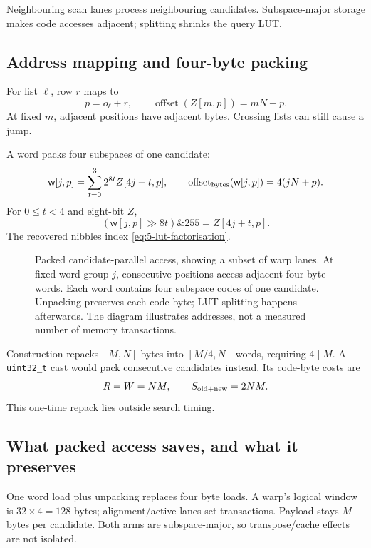 Neighbouring scan lanes process neighbouring candidates. Subspace-major storage makes code accesses adjacent; splitting shrinks the query LUT.

\subsection{Address mapping and four-byte packing}

For list $\ell$, row $r$ maps to
\[
 p=o_\ell+r,\qquad \operatorname{offset}(Z[m,p])=mN+p.
\]
At fixed $m$, adjacent positions have adjacent bytes. Crossing lists can still cause a jump.

A word packs four subspaces of one candidate:
\begin{equation}
 \mathsf{w}[j,p]=\sum_{t=0}^{3}2^{8t}Z[4j+t,p],\qquad
 \operatorname{offset}_{\rm bytes}(\mathsf{w}[j,p])=4(jN+p).
 \label{eq:5-packed-layout}
\end{equation}
For $0\leq t<4$ and eight-bit $Z$,
\[
 (\mathsf w[j,p]\gg8t)\mathbin{\&}255=Z[4j+t,p].
\]
The recovered nibbles index \cref{eq:5-lut-factorisation}.

\begin{figure}[tbp]
\centering

\caption[Packed candidate-parallel access]{Packed candidate-parallel access, showing a subset of warp lanes.
At fixed word group $j$, consecutive positions access adjacent four-byte
words. Each word contains four subspace codes of one candidate. Unpacking
preserves each code byte; LUT splitting happens afterwards. The diagram
illustrates addresses, not a measured number of memory transactions.}
\label{fig:5-packed-access}
\end{figure}

Construction repacks $[M,N]$ bytes into $[M/4,N]$ words, requiring $4\mid M$. A \texttt{uint32\_t} cast would pack consecutive candidates instead. Its code-byte costs are
\[
 R=W=NM,\qquad S_{\rm old+new}=2NM.
\]
This one-time repack lies outside search timing.

\subsection{What packed access saves, and what it preserves}

One word load plus unpacking replaces four byte loads. A warp's logical window is $32\times4=128$ bytes; alignment/active lanes set transactions. Payload stays $M$ bytes per candidate. Both arms are subspace-major, so transpose/cache effects are not isolated.

